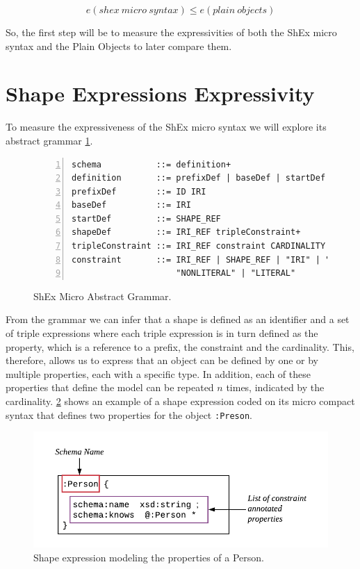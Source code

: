 \begin{equation} \label{eq:expressivity-question}
    e(shex\ micro\ syntax) \leq e(plain\ objects)
\end{equation}

So, the first step will be to measure the expressivities of both the ShEx micro syntax and the Plain Objects to later
compare them.


\section{Shape Expressions Expressivity}
To measure the expressiveness of the ShEx micro syntax we will explore its abstract grammar \cref{fig:shex-micro-abstract-grammar}.

\begin{figure}
\begin{lstlisting}[numbers=left,basicstyle=\ttfamily\small]
schema           ::= definition+
definition       ::= prefixDef | baseDef | startDef | shapeDef
prefixDef        ::= ID IRI
baseDef          ::= IRI
startDef         ::= SHAPE_REF
shapeDef         ::= IRI_REF tripleConstraint+
tripleConstraint ::= IRI_REF constraint CARDINALITY
constraint       ::= IRI_REF | SHAPE_REF | "IRI" | "BNODE" |
                     "NONLITERAL" | "LITERAL"
\end{lstlisting}
\caption[ShEx Micro Abstract Grammar]{ShEx Micro Abstract Grammar.}
\label{fig:shex-micro-abstract-grammar}
\end{figure}

From the grammar we can infer that a shape is defined as an identifier and a set of triple expressions where each
triple expression is in turn defined as the property, which is a reference to a prefix, the constraint and the
cardinality. This, therefore, allows us to express that an object can be defined by one or by multiple properties,
each with a specific type. In addition, each of these properties that define the model can be repeated $n$ times,
indicated by the cardinality. \cref{fig:prop-def-shape-diagram} shows an example of a shape expression coded on
its micro compact syntax that defines two properties for the object \texttt{:Preson}.

\begin{figure}
    \includegraphics[scale=0.7]{images/shex-example-parts.pdf}
    \centering
    \caption[Shape expression modeling the properties of a Person]{Shape expression modeling the properties of a Person.}
    \label{fig:prop-def-shape-diagram}
\end{figure}

